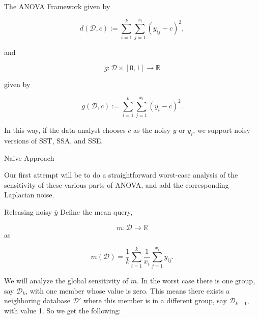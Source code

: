 \documentclass[11pt]{article}
\begin{document}
\begin{section}{The ANOVA Framework}
given by

\[
d(\mathcal{D},c) := \sum_{i=1}^k \sum_{j=1}^{x_i} (y_{ij} - c)^2,
\]

and 

\[
g:\mathcal{D}\times [0,1]\to\mathbb{R}
\]

given by

\[
g(\mathcal{D},c) := \sum_{i=1}^k \sum_{j=1}^{x_i} (\overline{y_i} - c)^2.
\]

In this way, if the data analyst chooses $c$ as the noisy $\overline{y}$ or 
$\overline{y_i}$, we support noisy versions of SST, SSA, and SSE.

\end{section}

\begin{section}{Naive Approach}

Our first attempt will be to do a straightforward worst-case analysis of 
the sensitivity of these various parts of ANOVA, and add the corresponding 
Laplacian noise. 

\begin{subsection}{Releasing noisy $\overline{y}$}
Define the mean query,

\[
m:\mathcal{D}\to\mathbb{R}
\]
as 

\[
m(\mathcal{D}) = \frac{1}{k} \sum_{i=1}^k \frac{1}{x_i} 
  \sum_{j=1}^{x_i} y_{ij}.
\]

We will analyze the global sensitivity of $m$. In the worst 
case there is one group, say $\mathcal{D}_k$, with one member whose 
value is zero. This means there exists a neighboring database $\mathcal{D}'$ 
where this member is in a different group, say $\mathcal{D}_{k-1}$, with 
value 1. So we get the following:


\end{subsection}
\end{section}
\end{document}
